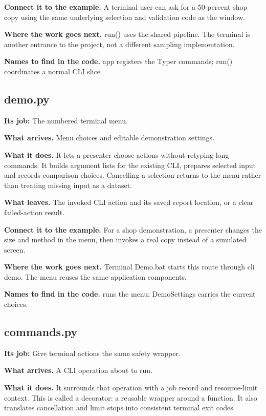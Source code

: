 \textbf{Connect it to the example.} A terminal user can ask for a 50-percent shop copy using the same underlying selection and validation code as the window.

\textbf{Where the work goes next.} run() uses the shared pipeline. The terminal is another entrance to the project, not a different sampling implementation.

\textbf{Names to find in the code.} app registers the Typer commands; run() coordinates a normal CLI slice.


\subsection{demo.py}

\textbf{Its job:} The numbered terminal menu.

\textbf{What arrives.} Menu choices and editable demonstration settings.

\textbf{What it does.} It lets a presenter choose actions without retyping long commands. It builds argument lists for the existing CLI, prepares selected input and records comparison choices. Cancelling a selection returns to the menu rather than treating missing input as a dataset.

\textbf{What leaves.} The invoked CLI action and its saved report location, or a clear failed-action result.

\textbf{Connect it to the example.} For a shop demonstration, a presenter changes the size and method in the menu, then invokes a real copy instead of a simulated screen.

\textbf{Where the work goes next.} Terminal Demo.bat starts this route through cli demo. The menu reuses the same application components.

\textbf{Names to find in the code.}  runs the menu; DemoSettings carries the current choices.


\subsection{commands.py}

\textbf{Its job:} Give terminal actions the same safety wrapper.

\textbf{What arrives.} A CLI operation about to run.

\textbf{What it does.} It surrounds that operation with a job record and resource-limit context. This is called a decorator: a reusable wrapper around a function. It also translates cancellation and limit stops into consistent terminal exit codes.

